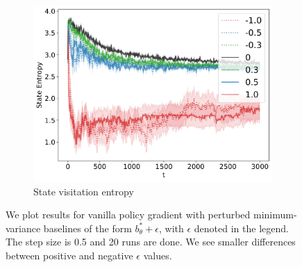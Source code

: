 \begin{figure}[!ht]
\begin{subfigure}[b]{0.32\linewidth}
    \includegraphics[width=\textwidth]{articles/baselines/figs/baseline_4rooms/VPG_absolute_perturb_State_Entropy.png}
    \caption{State visitation entropy}
  \end{subfigure}
  \caption{We plot results for vanilla policy gradient with perturbed minimum-variance baselines of the form $b^\ast_\theta + \epsilon$, with $\epsilon$ denoted in the legend. The step size is 0.5 and 20 runs are done. We see smaller differences between positive and negative $\epsilon$ values. ~\label{appfig:4rooms_vpg_relative_perturb}}
\end{figure}


